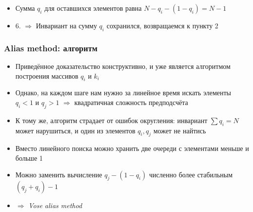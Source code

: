 \documentclass[10pt]{beamer}
\begin{document}
\begin{frame}
\begin{itemize}
\pause
\item Сумма \begin{math}q_i\end{math} для оставшихся элементов равна \begin{math}N - q_i - (1 - q_i) = N - 1\end{math}
\pause
\item 6. \begin{math}\Longrightarrow\end{math} Инвариант на сумму \begin{math}q_i\end{math} сохранился, возвращаемся к пункту 2
\end{itemize}
\end{frame}

\begin{frame}
\frametitle{Alias method: алгоритм}
\begin{itemize}
\item Приведённое доказательство конструктивно, и уже является алгоритмом построения массивов \begin{math}q_i\end{math} и \begin{math}k_i\end{math}
\pause
\item Однако, на каждом шаге нам нужно за линейное время искать элементы \begin{math}q_i < 1\end{math} и \begin{math}q_j > 1\end{math} \begin{math}\Longrightarrow\end{math} квадратичная сложность предподсчёта
\pause
\item К тому же, алгоритм страдает от ошибок округления: инвариант \begin{math}\sum q_i = N\end{math} может нарушиться, и один из элементов \begin{math}q_i, q_j\end{math} может не найтись
\pause
\item Вместо линейного поиска можно хранить две очереди с элементами меньше и больше 1
\pause
\item Можно заменить вычисление \begin{math}q_j - (1 - q_i)\end{math} численно более стабильным \begin{math}(q_j + q_i) - 1\end{math}
\pause
\item \begin{math}\Longrightarrow\end{math} \textit{Vose alias method}
\end{itemize}
\end{frame}
\end{document}
